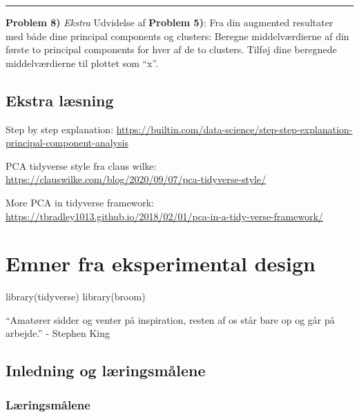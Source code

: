 \documentclass[
]{book}
\newenvironment{Shaded}{\begin{snugshade}}{\end{snugshade}}
\newcommand{\FunctionTok}[1]{\textcolor[rgb]{0.00,0.00,0.00}{#1}}
\newcommand{\NormalTok}[1]{#1}
\begin{document}
\begin{center}\rule{0.5\linewidth}{0.5pt}\end{center}

\textbf{Problem 8)} \emph{Ekstra} Udvidelse af \textbf{Problem 5)}: Fra din augmented resultater med både dine principal components og clusters: Beregne middelværdierne af din første to principal components for hver af de to clusters. Tilføj dine beregnede middelværdierne til plottet som ``x''.

\hypertarget{ekstra-luxe6sning}{%
\section{Ekstra læsning}\label{ekstra-luxe6sning}}

Step by step explanation: \url{https://builtin.com/data-science/step-step-explanation-principal-component-analysis}

PCA tidyverse style fra claus wilke: \url{https://clauswilke.com/blog/2020/09/07/pca-tidyverse-style/}

More PCA in tidyverse framework: \url{https://tbradley1013.github.io/2018/02/01/pca-in-a-tidy-verse-framework/}

\hypertarget{emner-fra-eksperimental-design}{%
\chapter{Emner fra eksperimental design}\label{emner-fra-eksperimental-design}}

\begin{Shaded}
\begin{Highlighting}[]
\FunctionTok{library}\NormalTok{(tidyverse)}
\FunctionTok{library}\NormalTok{(broom)}
\end{Highlighting}
\end{Shaded}

``Amatører sidder og venter på inspiration, resten af os står bare op og går på arbejde.'' - Stephen King

\hypertarget{inledning-og-luxe6ringsmuxe5lene-1}{%
\section{Inledning og læringsmålene}\label{inledning-og-luxe6ringsmuxe5lene-1}}

\hypertarget{luxe6ringsmuxe5lene-6}{%
\subsection{Læringsmålene}\label{luxe6ringsmuxe5lene-6}}
\end{document}
